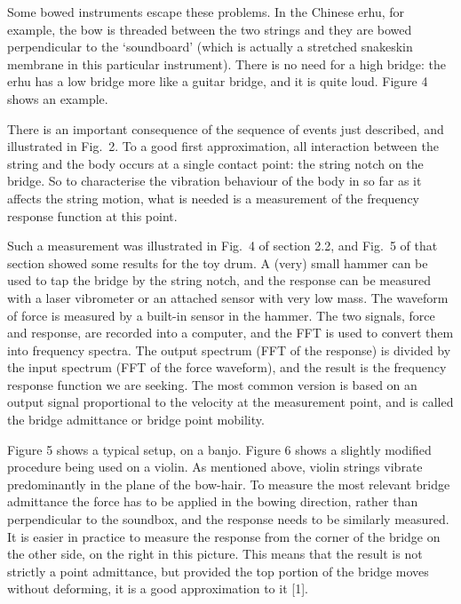   Some bowed instruments escape these problems. In the Chinese erhu, for 
  example, the bow is threaded between the two strings and they are bowed 
  perpendicular to the ‘soundboard’ (which is actually a stretched snakeskin 
  membrane in this particular instrument). There is no need for a high bridge: 
  the erhu has a low bridge more like a guitar bridge, and it is quite loud. 
  Figure 4 shows an example. 

  There is an important consequence of the sequence of events just described, 
  and illustrated in Fig.\ 2. To a good first approximation, all interaction 
  between the string and the body occurs at a single contact point: the string 
  notch on the bridge. So to characterise the vibration behaviour of the body 
  in so far as it affects the string motion, what is needed is a measurement of 
  the frequency response function at this point. 

  Such a measurement was illustrated in Fig.\ 4 of section 2.2, and Fig.\ 5 of 
  that section showed some results for the toy drum. A (very) small hammer can 
  be used to tap the bridge by the string notch, and the response can be 
  measured with a laser vibrometer or an attached sensor with very low mass. 
  The waveform of force is measured by a built-in sensor in the hammer. The two 
  signals, force and response, are recorded into a computer, and the FFT is 
  used to convert them into frequency spectra. The output spectrum (FFT of the 
  response) is divided by the input spectrum (FFT of the force waveform), and 
  the result is the frequency response function we are seeking. The most common 
  version is based on an output signal proportional to the velocity at the 
  measurement point, and is called the bridge admittance or bridge point 
  mobility. 

  Figure 5 shows a typical setup, on a banjo. Figure 6 shows a slightly 
  modified procedure being used on a violin. As mentioned above, violin strings 
  vibrate predominantly in the plane of the bow-hair. To measure the most 
  relevant bridge admittance the force has to be applied in the bowing 
  direction, rather than perpendicular to the soundbox, and the response needs 
  to be similarly measured. It is easier in practice to measure the response 
  from the corner of the bridge on the other side, on the right in this 
  picture. This means that the result is not strictly a point admittance, but 
  provided the top portion of the bridge moves without deforming, it is a good 
  approximation to it [1]. 

